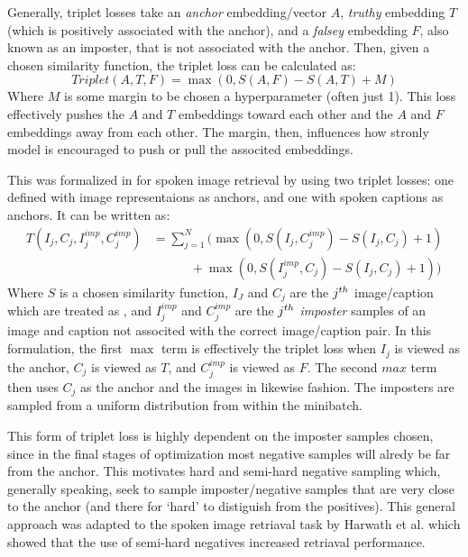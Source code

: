 Generally, triplet losses take an \textit{anchor} embedding/vector $A$, \textit{truthy} embedding $T$ (which is positively associated with the anchor), and a \textit{falsey} embedding $F$, also known as an imposter, that is not associated with the anchor. 
Then, given a chosen similarity function, the triplet loss can be calculated as:
\begin{equation}
\label{orig_triplet_loss}
    Triplet(A, T, F) = \max(0, S(A, F) - S(A, T) +M)
\end{equation}
Where $M$ is some margin to be chosen a hyperparameter (often just 1). 
This loss effectively pushes the $A$ and $T$ embeddings toward each other and the $A$ and $F$ embeddings away from each other.
The margin, then, influences how stronly model is encouraged to push or pull the associted embeddings.

This was formalized in \cite{harwath2017unsupervised} for spoken image retrieval by using two triplet losses: one defined with image representaions as anchors, and one with spoken captions as anchors.
It can be written as:
\begin{align}
    \label{retrieval_triplet}
    T(I_j, C_j, I_j^{imp}, C_j^{imp}) &= \sum_{j=1}^N \Big(\max(0,S(I_j, C_j^{imp}) - S(I_j, C_j) +1) \\
                                      &{\quad\quad\quad+} \max(0,S(I_j^{imp}, C_j) - S(I_j, C_j) +1)\Big)
\end{align}
Where $S$ is a chosen similarity function,  $I_J$ and $C_j$ are the $j^{th}$  image/caption which are treated as , and $I_j^{imp}$ and $C_j^{imp}$ are the $j^{th}$ \textit{imposter} samples of an image and caption not associted with the correct image/caption pair.
In this formulation, the first $\max$ term is effectively the triplet loss when  $I_j$ is viewed as the anchor, $C_j$ is viewed as $T$, and  $C_j^{imp}$ is viewed as $F$.
The second $max$ term then uses $C_j$ as the anchor and the images in likewise fashion.
The imposters are sampled from a uniform distribution from within the minibatch.

This form of triplet loss is highly dependent on the imposter samples chosen, since in the final stages of optimization most negative samples will alredy be far from the anchor.
This motivates hard and semi-hard negative sampling \cite{jansen2018unsupervised} which, generally speaking, seek to sample imposter/negative samples that are very close to the anchor (and there for `hard' to distiguish from the positives).
This general approach was adapted to the spoken image retriaval task by Harwath et al. \cite{harwath2018jointly} which showed that the use of semi-hard negatives increased retriaval performance.

